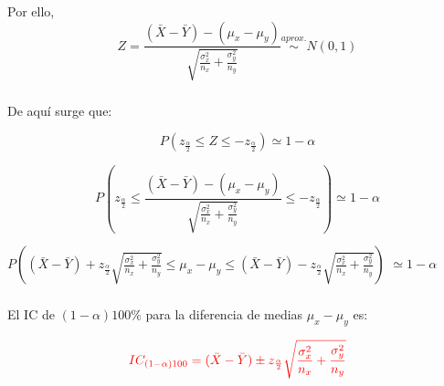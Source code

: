 \documentclass{beamer}
\begin{document}
\begin{frame}
\frametitle{}

Por ello,
$$Z=\frac{(\bar{X}-\bar{Y})-(\mu_x-\mu_y)}{\sqrt{\frac{\sigma_x^2}{n_x}+\frac{\sigma_y^2}{n_y}}} \stackrel{aprox.}\sim N(0,1)$$
\end{frame}



\begin{frame}
\frametitle{}

De aquí surge que:

$$P(z_{\frac{\alpha}{2}}\leq Z\leq -z_{\frac{\alpha}{2}}) \simeq 1-\alpha$$

$$P(z_{\frac{\alpha}{2}}\leq \frac{(\bar{X}-\bar{Y})-(\mu_x-\mu_y)}{\sqrt{\frac{\sigma_x^2}{n_x}+\frac{\sigma_y^2}{n_y}}}\leq -z_{\frac{\alpha}{2}}) \simeq 1-\alpha$$

$P((\bar{X}-\bar{Y}) + z_{\frac{\alpha}{2}}\sqrt{\frac{\sigma_x^2}{n_x}+\frac{\sigma_y^2}{n_y}}\leq \mu_x-\mu_y\leq (\bar{X}-\bar{Y})-z_{\frac{\alpha}{2}}\sqrt{\frac{\sigma_x^2}{n_x}+\frac{\sigma_y^2}{n_y}})$ $ \simeq 1-\alpha$

\end{frame}



\begin{frame}
\frametitle{}

El IC de $(1-\alpha)100\%$ para la diferencia de medias
$\mu_x-\mu_y$ es:

$$\color{red}{IC_{(1-\alpha)100}=(\bar{X}-\bar{Y}) \pm z_{\frac{\alpha}{2}}\sqrt{\frac{\sigma_x^2}{n_x}+\frac{\sigma_y^2}{n_y}}}$$

\end{frame}
\end{document}
